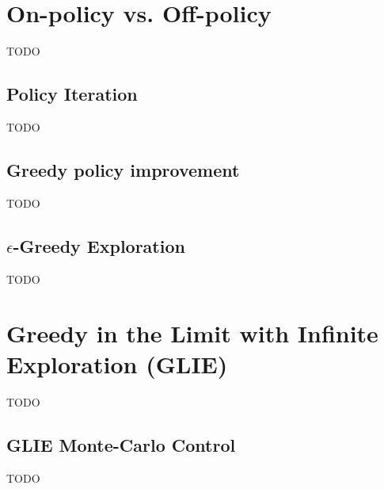 \section{On-policy vs. Off-policy}\label{sec:on-policy-vs-off-policy}
TODO

\subsection{Policy Iteration}\label{subsec:policy-iteration}
TODO

\subsection{Greedy policy improvement}\label{subsec:greedy-policy-improvement}
TODO
%
%
\subsection{$\epsilon$-Greedy Exploration}\label{subsec:epsilon-greedy-exploration}
TODO


\section{Greedy in the Limit with Infinite Exploration (GLIE)}\label{sec:greedy-in-the-limit-with-infinite-exploration}
TODO

\subsection{GLIE Monte-Carlo Control}\label{subsec:glie-monte-carlo-control}
TODO
%
%
%


